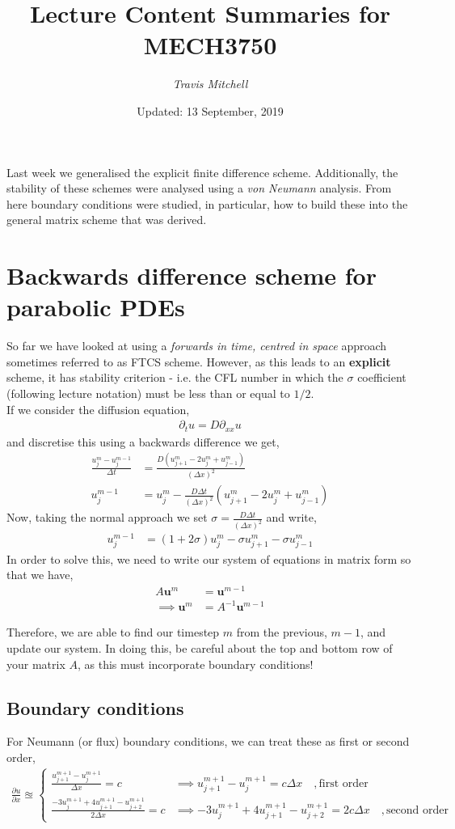 \documentclass[11pt,a4paper]{report}
\author{\textit{Travis Mitchell}}
\title{Lecture Content Summaries for MECH3750}
\date{Updated: 13 September, 2019}
\theoremstyle{definition}
\begin{document}
Last week we generalised the explicit finite difference scheme. Additionally, the stability of these schemes were analysed using a \textit{von Neumann} analysis. From here boundary conditions were studied, in particular, how to build these into the general matrix scheme that was derived.

\section{Backwards difference scheme for parabolic PDEs}
So far we have looked at using a \textit{forwards in time, centred in space} approach sometimes referred to as FTCS scheme. However, as this leads to an \textbf{explicit} scheme, it has stability criterion - i.e. the CFL number in which the $\sigma$ coefficient (following lecture notation) must be less than or equal to $1/2$. \\

If we consider the diffusion equation,
\begin{align*}
	\partial_t u = D\partial_{xx} u
\end{align*}
and discretise this using a backwards difference we get,
\begin{align*}
	\frac{u_j^m - u_j^{m-1}}{\Delta t} &= \frac{D(u_{j+1}^m - 2u_j^m + u_{j-1}^m)}{(\Delta x)^2} \\
	u_j^{m-1} &= u_j^m - \frac{D \Delta t}{(\Delta x)^2} \left(u_{j+1}^m - 2u_j^m + u_{j-1}^m\right)
\end{align*}
Now, taking the normal approach we set $\sigma = \frac{D \Delta t}{(\Delta x)^2}$ and write,
\begin{align*}
		u_j^{m-1} &= (1+2\sigma)u_j^m - \sigma u_{j+1}^m - \sigma u_{j-1}^m
\end{align*}
In order to solve this, we need to write our system of equations in matrix form so that we have,
\begin{align*}
	A\mathbf{u}^m &= \mathbf{u}^{m-1} \\
	\implies \mathbf{u}^m &= A^{-1} \mathbf{u}^{m-1}
\end{align*}

Therefore, we are able to find our timestep $m$ from the previous, $m-1$, and update our system. In doing this, be careful about the top and bottom row of your matrix $A$, as this must incorporate boundary conditions!

\subsection{Boundary conditions}
For Neumann (or flux) boundary conditions, we can treat these as first or second order,
\begin{align*}
	\frac{\partial u}{\partial x} \approxeq \begin{cases}
	\frac{u_{j+1}^{m+1} - u_j^{m+1}}{\Delta x} = c &\implies u_{j+1}^{m+1} - u_j^{m+1} = c\Delta x \quad, \text{first order} \\
	\frac{-3u_j^{m+1}+4u_{j+1}^{m+1} - u_{j+2}^{m+1}}{2\Delta x} = c &\implies -3u_j^{m+1}+4u_{j+1}^{m+1} - u_{j+2}^{m+1} = 2c\Delta x \quad, \text{second order}
	\end{cases}
\end{align*}
\end{document}
